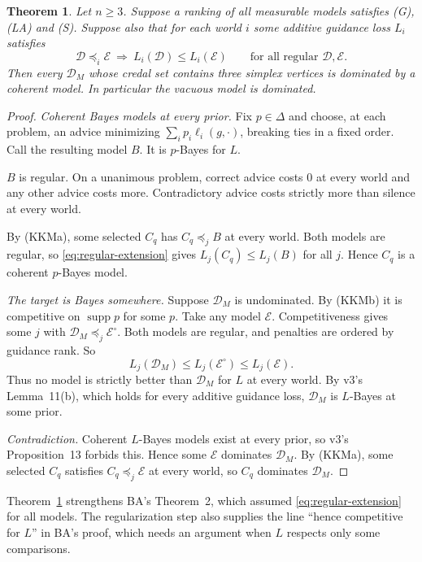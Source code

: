 \documentclass[11pt]{article}
\newtheorem{theorem}{Theorem}
\theoremstyle{remark}\newtheorem{remark}[theorem]{Remark}
\newcommand{\Dscr}{\mathcal D}
\newcommand{\Escr}{\mathcal E}
\newcommand{\supp}{\operatorname{supp}}
\begin{document}
\begin{theorem}\label{thm:regular}
Let $n\ge3$. Suppose a ranking of all measurable models satisfies (G), (LA)
and (S). Suppose also that for each world $i$ some additive guidance loss
$L_i$ satisfies
\begin{equation}
 \Dscr\preceq_i\Escr\ \Longrightarrow\ L_i(\Dscr)\le L_i(\Escr)
 \qquad\text{for all regular }\Dscr,\Escr.
 \label{eq:regular-extension}
\end{equation}
Then every $\Dscr_M$ whose credal set contains three simplex vertices is
dominated by a coherent model. In particular the vacuous model is dominated.
\end{theorem}
\begin{proof}
\emph{Coherent Bayes models at every prior.} Fix $p\in\Delta$ and choose, at
each problem, an advice minimizing $\sum_ip_i\ell_i(g,\cdot)$, breaking ties
in a fixed order. Call the resulting model $B$. It is $p$-Bayes for $L$.

$B$ is regular. On a unanimous problem, correct advice costs $0$ at every
world and any other advice costs more. Contradictory advice costs strictly
more than silence at every world.

By (KKMa), some selected $C_q$ has $C_q\preceq_jB$ at every world. Both
models are regular, so \eqref{eq:regular-extension} gives
$L_j(C_q)\le L_j(B)$ for all $j$. Hence $C_q$ is a coherent $p$-Bayes model.

\emph{The target is Bayes somewhere.} Suppose $\Dscr_M$ is undominated. By
(KKMb) it is competitive on $\supp p$ for some $p$. Take any model $\Escr$.
Competitiveness gives some $j$ with $\Dscr_M\preceq_j\Escr^\circ$. Both models
are regular, and penalties are ordered by guidance rank. So
\[
 L_j(\Dscr_M)\le L_j(\Escr^\circ)\le L_j(\Escr).
\]
Thus no model is strictly better than $\Dscr_M$ for $L$ at every world. By
v3's Lemma~11(b), which holds for every additive guidance loss,
$\Dscr_M$ is $L$-Bayes at some prior.

\emph{Contradiction.} Coherent $L$-Bayes models exist at every prior, so v3's
Proposition~13 forbids this. Hence some $\Escr$
dominates $\Dscr_M$. By (KKMa), some selected $C_q$ satisfies
$C_q\preceq_j\Escr$ at every world, so $C_q$ dominates $\Dscr_M$.
\end{proof}

Theorem~\ref{thm:regular} strengthens BA's Theorem~2, which assumed
\eqref{eq:regular-extension} for all models. The regularization step also
supplies the line ``hence competitive for $L$'' in BA's proof, which needs an
argument when $L$ respects only some comparisons.
\end{document}
